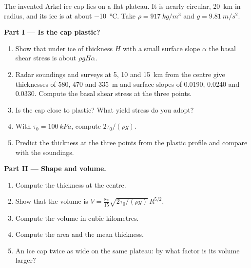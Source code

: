 \begin{problem}
\label{pb:b3:glaciology:1}
The invented Arkel ice cap lies on a flat plateau. It is nearly circular,
\qty{20}{km} in radius, and its ice is at about \qty{-10}{\celsius}. Take
$\rho = \qty{917}{kg/m^3}$ and $g = \qty{9.81}{m/s^2}$.

\medskip\noindent\textbf{Part I --- Is the cap plastic?}
\begin{enumerate}
\item Show that under ice of thickness $H$ with a small surface slope
  $\alpha$ the basal shear stress is about $\rho gH\alpha$.
\item Radar soundings and surveys at 5, 10 and \qty{15}{km} from the centre
  give thicknesses of 580, 470 and \qty{335}{m} and surface slopes of
  \num{0.0190}, \num{0.0240} and \num{0.0330}. Compute the basal shear
  stress at the three points.
\item Is the cap close to plastic? What yield stress do you adopt?
\item With $\tau_0 = \qty{100}{kPa}$, compute $2\tau_0/(\rho g)$.
\item Predict the thickness at the three points from the plastic profile
  and compare with the soundings.
\end{enumerate}

\medskip\noindent\textbf{Part II --- Shape and volume.}
\begin{enumerate}[resume]
\item Compute the thickness at the centre.
\item Show that the volume is $V = \frac{8\pi}{15}\sqrt{2\tau_0/(\rho
  g)}\,R^{5/2}$.
\item Compute the volume in cubic kilometres.
\item Compute the area and the mean thickness.
\item An ice cap twice as wide on the same plateau: by what factor is its
  volume larger?
\end{enumerate}


\end{problem}
